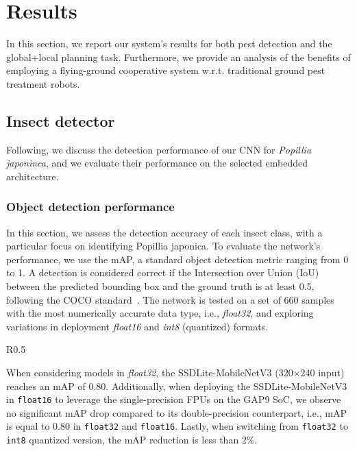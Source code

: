 
\section{Results}
\label{sec:results}
In this section, we report our system's results for both pest detection and the global+local planning task.
Furthermore, we provide an analysis of the benefits of employing a flying-ground cooperative system w.r.t. traditional ground pest treatment robots.


\subsection{Insect detector}

Following, we discuss the detection performance of our CNN for \textit{Popillia japoninca}, and we evaluate their performance on the selected embedded architecture.


\subsubsection{Object detection performance}
\label{subsec:object_detection_performance}

In this section, we assess the detection accuracy of each insect class, with a particular focus on identifying Popillia japonica. 
To evaluate the network's performance, we use the mAP, a standard object detection metric ranging from 0 to 1. 
A detection is considered correct if the Intersection over Union (IoU) between the predicted bounding box and the ground truth is at least 0.5, following the COCO standard~\cite{cocodataset}. 
The network is tested on a set of 660 samples with the most numerically accurate data type, i.e., \textit{float32}, and exploring variations in deployment \textit{float16} and \textit{int8} (quantized) formats.

\begin{wraptable}{R}{0.5\textwidth}
    \small\centering
    \caption{SSDLite-MobileNetV3 AP per each class of insect and per average bounding boxes dimension.}
    \label{tab:perclass_perbbox_mAP}
\end{wraptable}
When considering models in \textit{float32}, the SSDLite-MobileNetV3 (320$\times$240 input) reaches an mAP of 0.80. 
Additionally, when deploying the SSDLite-MobileNetV3 in \texttt{float16} to leverage the single-precision FPUs on the GAP9 SoC, we observe no significant mAP drop compared to its double-precision counterpart, i.e., mAP is equal to 0.80 in \texttt{float32} and \texttt{float16}. 
Lastly, when switching from \texttt{float32} to \texttt{int8} quantized version, the mAP reduction is less than 2\%. 



